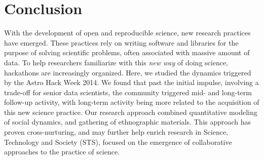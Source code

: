 \section{Conclusion}
With the development of open and reproducible science, new research practices have emerged. These practices rely on writing software and libraries for the purpose of solving scientific problems, often associated with massive amount of data. To help researchers familiarize with this {\it new way} of doing science, hackathons are increasingly organized. Here, we studied the dynamics triggered by the Astro Hack Week 2014. We found that past the initial impulse, involving a trade-off for senior data scientists, the community triggered mid- and long-term follow-up activity, with long-term activity being more related to the acquisition of this new science practice. Our research approach combined quantitative modeling of social dynamics, and gathering of ethnographic materials. This approach has proven cross-nurturing, and may further help enrich research in Science, Technology and Society (STS), focused on the emergence of collaborative approaches to the practice of science.